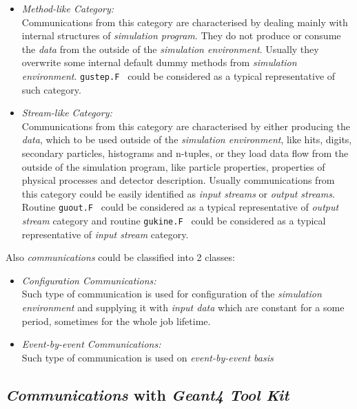 \documentclass[nfss,times,12pt,a4paper]{article}
\begin{document}
{\begin{itemize}
\item {\it Method-like Category:} \\
           Communications from this category 
           are  characterised by dealing mainly with 
           internal structures of {\it simulation program}.
           They do not produce or consume the {\it data}  
           from the outside of the {\it simulation environment}.
           Usually they overwrite some internal default dummy 
           methods from {\it simulation environment}.   
           {\tt gustep.F } could be considered as a typical 
           representative of such category.
\item {\it Stream-like Category:} \\ 
           Communications from this category 
           are  characterised by either producing the  
           {\it data}, which to be used outside of the 
           {\it simulation environment}, like hits, digits, 
           secondary particles, histograms and n-tuples,   
           or they load data flow from the outside 
           of the simulation program, like  particle properties, 
           properties of physical processes and detector description. 
           Usually communications from this category could be easily 
           identified as {\it input streams} or {\it output streams}.
           Routine {\tt guout.F } could be considered as a typical 
           representative of {\it output stream } category and 
           routine {\tt gukine.F } could be considered as a typical 
           representative of {\it input stream } category.
\end{itemize} 
	
Also {\it communications } could be classified into 2 classes:
\begin{itemize} 	
 \item {\it Configuration  Communications:} \\ 
        Such type of communication is used for configuration of the 
        {\it simulation environment} and supplying it with {\it input
        data} which are constant for a some period, sometimes for 
        the whole job  lifetime.  
 \item {\it Event-by-event Communications:} \\ 
        Such type of communication is used on {\it event-by-event basis}
\end{itemize} 

\subsection{ {\sl Communications} with {\it Geant4 Tool Kit} } 

}
\end{document}
